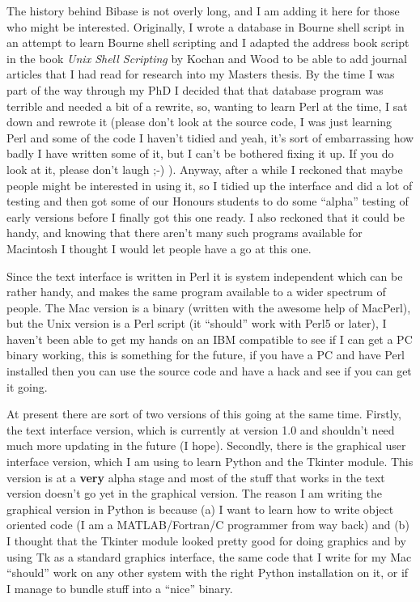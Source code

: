 \documentclass[12pt,a4paper]{book}
\begin{document}
The history behind Bibase is not overly long, and I am adding it here 
for those who might be interested.  Originally, I wrote a database 
in Bourne shell script in an attempt to learn Bourne shell scripting 
and I adapted the address book script in the book \emph{Unix Shell 
Scripting} by Kochan and Wood to be able to add journal articles that 
I had read for research into my Masters thesis.  By the time I was 
part of the way through my PhD I decided that that database program 
was terrible and needed a bit of a rewrite, so, wanting to learn Perl 
at the time, I sat down and rewrote it (please don't look at the 
source code, I was just learning Perl and some of the code I haven't tidied 
and yeah, it's sort of 
embarrassing how badly I have written some of it, but I can't be 
bothered fixing it up.  If you do look at it, please don't laugh ;-) ).
Anyway, after a while I reckoned that maybe people might be 
interested in using it, so I tidied up the interface and did a 
lot of testing and then got some of our Honours students to do some 
``alpha'' testing of early versions before I finally got this one 
ready.  I also reckoned that it could be handy, and knowing that there 
aren't many such programs available for Macintosh I thought I would 
let people have a go at this one.  

Since the text interface is 
written in Perl it is system independent which can be rather handy, 
and makes the same program available to a wider spectrum of people. 
The Mac version is a binary (written with the awesome help of MacPerl), 
but the Unix version is a Perl script (it 
``should'' work with Perl5 or later), I haven't been able to get my 
hands on an IBM compatible to see if I can get a PC binary working, 
this is something for the future, if you have a PC and have Perl 
installed then you can use the source code and have a hack and see if 
you can get it going.

At present there are sort of two versions of this going at the same 
time.  Firstly, the text interface version, which is currently at 
version 1.0 and shouldn't need much more updating in the future (I 
hope).  Secondly, there is the graphical user interface version, 
which I am using to learn Python and the Tkinter module.  This 
version is at a {\bf very} alpha stage and most of the stuff that 
works in the text version doesn't go yet in the graphical version.  
The reason I am writing the graphical version in Python is because 
(a) I want to learn how to write object oriented code (I am a 
MATLAB/Fortran/C programmer from way back) and (b) I thought that the 
Tkinter module looked pretty good for doing graphics and by using Tk 
as a standard graphics interface, the same code that I write for my 
Mac ``should'' work on any other system with the right Python 
installation on it, or if I manage to bundle stuff into a ``nice'' 
binary.
\end{document}

